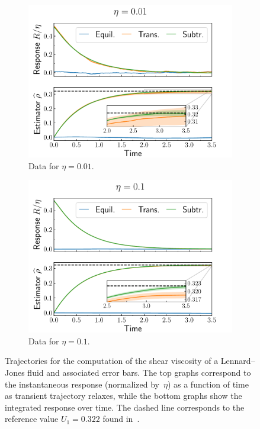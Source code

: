 \documentclass[11pt]{article}
\theoremstyle{definition}
\begin{document}
\begin{figure}[h!]
\centering
\begin{subfigure}{0.49\textwidth}
    \includegraphics[width=\textwidth]{LJ_shear_0.01.pdf}
    \caption{Data for $\eta = 0.01$.}
    \label{subfig:shear_0.01}
\end{subfigure}
\hfill
\begin{subfigure}{0.49\textwidth}
    \includegraphics[width=\textwidth]{LJ_shear_0.1.pdf}
    \caption{Data for $\eta = 0.1$.}
    \label{subfig:shear_0.1}
\end{subfigure}
\caption{Trajectories for the computation of the shear viscosity of a Lennard--Jones fluid and associated error bars. The top graphs correspond to the instantaneous response (normalized by~$\eta$) as a function of time as transient trajectory relaxes, while the bottom graphs show the integrated response over time. The dashed line corresponds to the reference value $U_1 = 0.322$ found in~\cite{blassel2024}.}
\label{fig:LJ_shear}
\end{figure}
\end{document}
